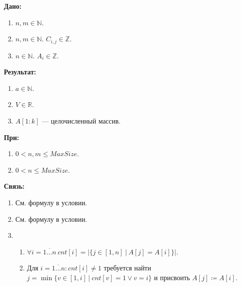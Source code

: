 \textbf{Дано:}
\begin{enumerate}
    \item \(n, m \in \mathbb{N}\).
    \item \(n, m \in \mathbb{N}\). \(C_{i,j} \in \mathbb{Z}\).
    \item \(n \in \mathbb{N}\). \(A_i \in \mathbb{Z}\).    
\end{enumerate}

\noindent
\textbf{Результат:}
\begin{enumerate}
   \item \(a \in \mathbb{N}\). 
   \item \(V \in \mathbb{R}\).
   \item \(A[1{:}k]\) --- целочисленный массив.    
\end{enumerate} 

\noindent
\textbf{При:} 
\begin{enumerate}\addtocounter{enumi}{1}
    \item \(0 < n, m \leq  MaxSize\).
    \item \(0 < n \leq MaxSize\). 
\end{enumerate}

\noindent
\textbf{Связь:} 
\begin{enumerate}
    \item См. формулу в условии.
    \item См. формулу в условии.
    \item 
    \begin{enumerate}
        \item \(\forall i = \overline{1\dots n}\ cnt[i] = \left\vert \{j \in {[1, n]}\ |\ A[j] = A[i] \} \right\vert \).
        \item Для \(i = \overline{1 \dots n}: cnt[i] \neq 1\) требуется найти \(j = \min\{v \in [1, i]\ |\ cnt[v] = 1 \lor v = i\}\) и присвоить \(A[j] \coloneqq A[i]\).
    \end{enumerate}
\end{enumerate}